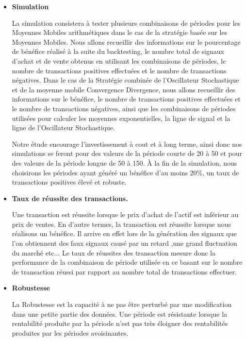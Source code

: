\begin{itemize}
\item
  \textbf{Simulation}

  La simulation consistera à tester plusieurs combinaisons de périodes
  pour les Moyennes Mobiles arithmétiques dans le cas de la stratégie
  basée sur les Moyennes Mobiles. Nous allons recueillir des
  informations sur le pourcentage de bénéfice réalisé à la suite du
  backtesting, le nombre total de signaux d'achat et de vente obtenus en
  utilisant les combinaisons de périodes, le nombre de transactions
  positives effectuées et le nombre de transactions négatives. Dans le
  cas de la Stratégie combinée de l'Oscillateur Stochastique et de la
  moyenne mobile Convergence Divergence, nous allons recueillir des
  informations sur le bénéfice, le nombre de transactions positives
  effectuées et le nombre de transactions négatives, ainsi que les
  combinaisons de périodes utilisées pour calculer les moyennes
  exponentielles, la ligne de signal et la ligne de l'Oscillateur
  Stochastique.

  Notre étude encourage l'investissement à cout et à long terme, ainsi
  donc nos simulations se feront pour des valeurs de la période courte
  de 20 à 50 et pour des valeurs de la période longue de 50 à 150. À la
  fin de la simulation, nous choisirons les périodes ayant généré un
  bénéfice d'au moins 20\%, un taux de transactions positives élevé et
  robuste.
\item
  \textbf{Taux de réussite des transactions.}

  Une transaction est réussite lorsque le prix d'achat de l'actif est
  inférieur au prix de ventes. En d'autre termes, la transaction est
  réussite lorsque nous réalisons un bénéfice. Il arrive en effet lors
  de la génération des signaux que l'on obtiennent des faux signaux
  causé par un retard ,une grand fluctuation du marché etc... Le taux de
  réussites des transaction mesure donc la performance de la combinaison
  de période utilisée en ce basant sur le nombre de transaction réussi
  par rapport au nombre total de transactions effectuer.
\item
  \textbf{Robustesse}

  {La Robustesse est la capacité à ne pas être perturbé par une
  modification dans une petite partie des données. Une période est
  résistante lorsque la rentabilité produite par la période n'est pas
  très éloigner des rentabilités produites par les périodes
  avoisinantes.}
\end{itemize}

